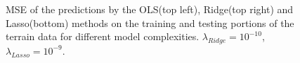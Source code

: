 \begin{figure}[!h]
    \caption{MSE of the predictions by the OLS(top left), Ridge(top right) and Lasso(bottom) methods on the training and testing portions of the terrain data for different model complexities. $\lambda_{Ridge} = 10^{-10}$, $\lambda_{Lasso} = 10^{-9}$.}
    \label{fig:appendix_train_test}
\end{figure}

